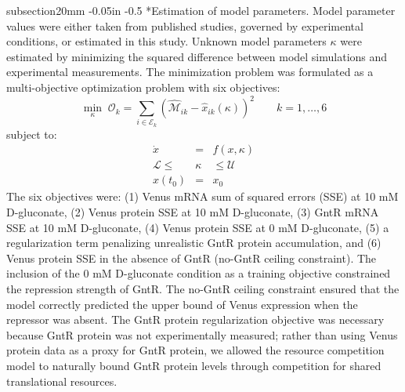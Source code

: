 \documentclass[12pt]{article}
\makeatletter
\renewcommand\subsection{\@startsection
	{subsection}{2}{0mm}
	{-0.05in}
	{-0.5\baselineskip}
	{\normalfont\normalsize\bfseries}}
\makeatother
\begin{document}
\subsection*{Estimation of model parameters.}
Model parameter values were either taken from published studies, governed by experimental conditions, or estimated in this study. Unknown model parameters $\kappa$ were estimated by minimizing the squared difference between model simulations and experimental measurements. The minimization problem was formulated as a multi-objective optimization problem with six objectives:
\begin{equation}
\min_{\kappa}\;\mathcal{O}_k = \sum_{i \in \mathcal{E}_k}\left(\hat{\mathcal{M}}_{ik} - \hat{x}_{ik}(\kappa)\right)^2 \qquad k = 1, \dots, 6
\end{equation}
subject to:
\begin{eqnarray}
\label{eq:model-eqn}
\dot{x} &=& f(x, \kappa) \\
\label{eq:eqn-bounds}
\mathcal{L} \leq &\kappa& \leq \mathcal{U} \\
\label{eq:eqn-initial-condition}
x(t_0) &=& x_0
\end{eqnarray}
The six objectives were: (1) Venus mRNA sum of squared errors (SSE) at 10 mM D-gluconate, (2) Venus protein SSE at 10 mM D-gluconate, (3) GntR mRNA SSE at 10 mM D-gluconate, (4) Venus protein SSE at 0 mM D-gluconate, (5) a regularization term penalizing unrealistic GntR protein accumulation, and (6) Venus protein SSE in the absence of GntR (no-GntR ceiling constraint). The inclusion of the 0 mM D-gluconate condition as a training objective constrained the repression strength of GntR. The no-GntR ceiling constraint ensured that the model correctly predicted the upper bound of Venus expression when the repressor was absent. The GntR protein regularization objective was necessary because GntR protein was not experimentally measured; rather than using Venus protein data as a proxy for GntR protein, we allowed the resource competition model to naturally bound GntR protein levels through competition for shared translational resources.
\end{document}
